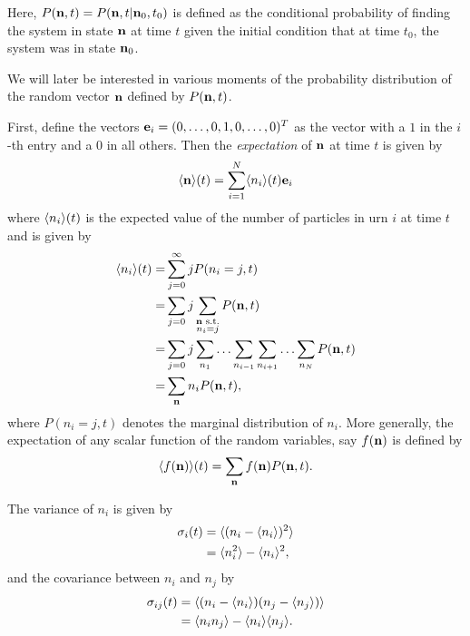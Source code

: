 Here, \(P(\mathbf{n},t) = P(\mathbf{n},t | \mathbf{n}_0, t_0)\) is defined as the conditional probability of finding the
system in state \(\mathbf{n}\) at time \(t\) given the initial condition that at time
\(t_0\), the system was in state \(\mathbf{n}_0\).

We will later be interested in various moments of the probability distribution
of the random vector \(\mathbf{n}\) defined by \(P(\mathbf{n},t)\).

First, define the vectors \(\mathbf{e}_i = (0,\dotsc,0,1,0,\dotsc,0)^T\) as the
vector with a \(1\) in the \(i\)-th entry and a \(0\) in all others. Then the
\emph{expectation} of \(\mathbf{n}\) at time \(t\) is given by
\begin{equation}
    \langle \mathbf{n} \rangle(t) = \sum_{i=1}^N \langle n_i \rangle(t) \mathbf{e}_i
    \label{eqn:expectation_n}
\end{equation}
where \(\langle n_i \rangle(t)\) is the expected value of the number of particles in urn
\(i\) at time \(t\) and is given by
\begin{equation}
    \begin{aligned}
        \langle n_i \rangle(t) =& \sum_{j=0}^\infty j P(n_i = j,t)\\
        =& \sum_{j=0} j
        \sum_{\substack{\mathbf{n} \text{ s.t.} \\ n_i=j}} P(\mathbf{n},t)\\
        =& \sum_{j=0} j
        \sum_{n_1} \dotso \sum_{n_{i-1}} \sum_{n_{i+1}} \dotso \sum_{n_N} P(\mathbf{n},t)\\
        =& \sum_{\mathbf{n}} n_i P(\mathbf{n},t),
    \end{aligned}
    \label{eqn:expecation_n_i}
\end{equation}
where \(P(n_i = j,t)\) denotes the marginal distribution of \(n_i\).  More
generally, the expectation of any scalar function of the random variables, say
\(f(\mathbf{n})\) is defined by
\begin{equation}
    \langle f(\mathbf{n}) \rangle(t) = \sum_{\mathbf{n}} f(\mathbf{n}) P(\mathbf{n},t).
    \label{eqn:expectation_f(n)}
\end{equation}

The variance of \(n_i\) is given by
\begin{equation}
    \begin{aligned}
        \sigma_i(t) &= \langle (n_i - \langle n_i \rangle)^2 \rangle\\
        &= \langle n_i^2 \rangle - \langle n_i \rangle^2,
    \end{aligned}
    \label{eqn:variance_n_i}
\end{equation}
and the covariance between \(n_i\) and \(n_j\) by
\begin{equation}
    \begin{aligned}
        \sigma_{ij}(t) &= \langle (n_i - \langle n_i \rangle)(n_j - \langle n_j \rangle) \rangle\\
        &= \langle n_i n_j \rangle - \langle n_i \rangle \langle n_j \rangle.
    \end{aligned}
    \label{eqn:covariance_n_i_n_j}
\end{equation}

